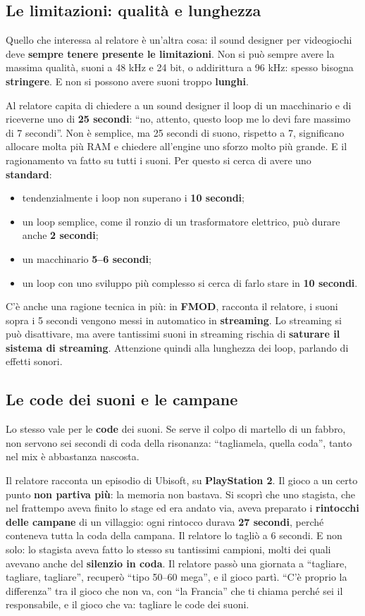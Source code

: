 \subsection{Le limitazioni: qualità e lunghezza}

Quello che interessa al relatore è un'altra cosa: il sound designer per
videogiochi deve \textbf{sempre tenere presente le limitazioni}. Non si può
sempre avere la massima qualità, suoni a 48 kHz e 24 bit, o addirittura a 96 kHz:
spesso bisogna \textbf{stringere}. E non si possono avere suoni troppo
\textbf{lunghi}.

Al relatore capita di chiedere a un sound designer il loop di un macchinario e di
riceverne uno di \textbf{25 secondi}: ``no, attento, questo loop me lo devi fare
massimo di 7 secondi''. Non è semplice, ma 25 secondi di suono, rispetto a 7,
significano allocare molta più RAM e chiedere all'engine uno sforzo molto più
grande. E il ragionamento va fatto su tutti i suoni. Per questo si cerca di avere
uno \textbf{standard}:
\begin{itemize}
  \item tendenzialmente i loop non superano i \textbf{10 secondi};
  \item un loop semplice, come il ronzio di un trasformatore elettrico, può
        durare anche \textbf{2 secondi};
  \item un macchinario \textbf{5--6 secondi};
  \item un loop con uno sviluppo più complesso si cerca di farlo stare in
        \textbf{10 secondi}.
\end{itemize}
C'è anche una ragione tecnica in più: in \textbf{FMOD}, racconta il relatore, i
suoni sopra i 5 secondi vengono messi in automatico in \textbf{streaming}. Lo
streaming si può disattivare, ma avere tantissimi suoni in streaming rischia di
\textbf{saturare il sistema di streaming}. Attenzione quindi alla lunghezza dei
loop, parlando di effetti sonori.

\subsection{Le code dei suoni e le campane}

Lo stesso vale per le \textbf{code} dei suoni. Se serve il colpo di martello di
un fabbro, non servono sei secondi di coda della risonanza: ``tagliamela, quella
coda'', tanto nel mix è abbastanza nascosta.

Il relatore racconta un episodio di Ubisoft, su \textbf{PlayStation 2}. Il gioco
a un certo punto \textbf{non partiva più}: la memoria non bastava. Si scoprì che
uno stagista, che nel frattempo aveva finito lo stage ed era andato via, aveva
preparato i \textbf{rintocchi delle campane} di un villaggio: ogni rintocco
durava \textbf{27 secondi}, perché conteneva tutta la coda della campana. Il
relatore lo tagliò a 6 secondi. E non solo: lo stagista aveva fatto lo stesso su
tantissimi campioni, molti dei quali avevano anche del \textbf{silenzio in coda}.
Il relatore passò una giornata a ``tagliare, tagliare, tagliare'', recuperò
``tipo 50--60 mega'', e il gioco partì. ``C'è proprio la differenza'' tra il
gioco che non va, con ``la Francia'' che ti chiama perché sei il responsabile, e
il gioco che va: tagliare le code dei suoni.

